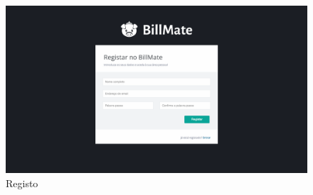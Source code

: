 
\newpage


\begin{figure}[H]
{
\includegraphics[width=.5\textwidth]{images/andre/registo}
\caption{Registo}
}
\end{figure}

